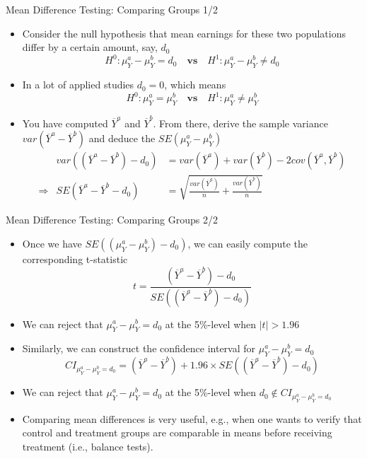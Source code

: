 \documentclass[notes,10pt, aspectratio=169]{beamer}
\begin{document}
\begin{frame}{Mean Difference Testing: Comparing Groups 1/2}
\begin{itemize}
    \item Consider the null hypothesis that mean earnings for these two populations differ by a certain amount, say, $d_0$
    \begin{equation*}
        H^0: \mu_Y^a - \mu_Y^b = d_0 \textbf{~~~vs~~~} H^1: \mu_Y^a - \mu_Y^b \neq d_0
    \end{equation*}
    \item In a lot of applied studies $d_0=0$, which means
        \begin{equation*}
        H^0: \mu_Y^a = \mu_Y^b \textbf{~~~vs~~~} H^1: \mu_Y^a \neq \mu_Y^b
    \end{equation*}
    \item You have computed $\overline{Y}^a$ and $\overline{Y}^b$. From there, derive the sample variance $var(\overline{Y}^a-\overline{Y}^b)$ and deduce the $SE(\mu_Y^a - \mu_Y^b)$
    \begin{eqnarray*}
       &var((\overline{Y}^a - \overline{Y}^b) - d_0) &=   var(\overline{Y}^a) +  var(\overline{Y}^b) - 2cov(\overline{Y}^a ,\overline{Y}^b)\\
       \Rightarrow &SE(\overline{Y}^a - \overline{Y}^b - d_0) &=\sqrt{\frac{var(\overline{Y}^a)}{n}+\frac{var(\overline{Y}^b)}{n}} 
    \end{eqnarray*}

\end{itemize}
\end{frame}


\begin{frame}{Mean Difference Testing: Comparing Groups 2/2}
\begin{itemize}
    \item Once we have $SE((\mu_Y^a - \mu_Y^b)  - d_0)$, we can easily compute the corresponding t-statistic
    \begin{equation*}
        t = \frac{(\overline{Y}^a - \overline{Y}^b) - d_0}{SE((\overline{Y}^a - \overline{Y}^b)  - d_0)}
    \end{equation*}
    \item[$\rightarrow$] We can reject that $\mu_Y^a - \mu_Y^b = d_0$ at the 5\%-level when $\mid t \mid > 1.96$ \vspace{.5cm}
    \item Similarly, we can construct the confidence interval for $\mu_Y^a - \mu_Y^b=d_0$
    \begin{equation*}
        CI_{\mu_Y^a - \mu_Y^b=d_0} = (\overline{Y}^a -\overline{Y}^b)+1.96\times SE((\overline{Y}^a - \overline{Y}^b)  - d_0)
    \end{equation*}
    \item[$\rightarrow$] We can reject that $\mu_Y^a - \mu_Y^b = d_0$ at the 5\%-level when $d_0\notin CI_{\mu_Y^a - \mu_Y^b=d_0}$\vspace{.5cm}
    \item Comparing mean differences is very useful, e.g., when one wants to verify that control and treatment groups are comparable in means before receiving treatment (i.e., balance tests).
\end{itemize}
\end{frame}
\end{document}
